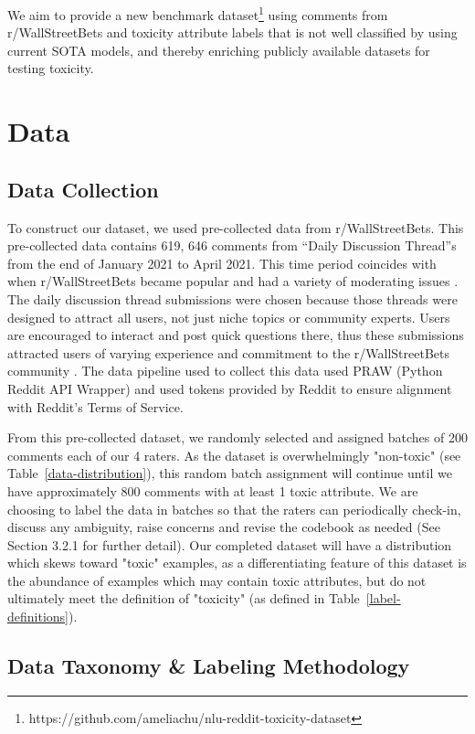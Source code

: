 \documentclass[11pt]{article}
\begin{document}
We aim to provide a new benchmark dataset\footnote{https://github.com/ameliachu/nlu-reddit-toxicity-dataset} using comments from r/WallStreetBets and toxicity attribute labels that is not well classified by using current SOTA models, and thereby enriching publicly available datasets for testing toxicity.


\section{Data}
\subsection{Data Collection}
To construct our dataset, we used pre-collected data from r/WallStreetBets. This pre-collected data contains 619, 646 comments from ``Daily Discussion Thread''s from the end of January 2021 to April 2021. This time period coincides with when  r/WallStreetBets became popular and had a variety of moderating issues \citep{mcenery2021}. The daily discussion thread submissions were chosen because those threads were designed to attract all users, not just niche topics or community experts. Users are encouraged to interact and post quick questions there, thus these submissions attracted users of varying experience and commitment to the r/WallStreetBets community \citep{wsb2022}. The data pipeline used to collect this data used PRAW (Python Reddit API Wrapper) and used tokens provided by Reddit to ensure alignment with Reddit's Terms of Service. 


From this pre-collected dataset, we randomly selected and assigned batches of 200 comments each of our 4 raters. As the dataset is overwhelmingly "non-toxic" (see Table~\ref{data-distribution}), this random batch assignment will continue until we have approximately 800 comments with at least 1 toxic attribute. We are choosing to label the data in batches so that the raters can periodically check-in, discuss any ambiguity, raise concerns and revise the codebook as needed (See Section 3.2.1 for further detail). Our completed dataset will have a distribution which skews toward "toxic" examples, as a differentiating feature of this dataset is the abundance of examples which may contain toxic attributes, but do not ultimately meet the definition of "toxicity" (as defined in Table~\ref{label-definitions}).

\subsection{Data Taxonomy \& Labeling Methodology}
\end{document}
